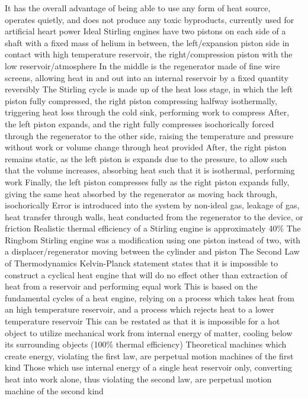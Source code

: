 \begin{outline*}
\2 It has the overall advantage of being able to use any form of heat source, operates quietly, and does not produce any toxic byproducts, currently used for artificial heart power
\2 Ideal Stirling engines have two pistons on each side of a shaft with a fixed mass of helium in between, the left/expansion piston side in contact with high temperature reservoir, the right/compression piston with the low reservoir/atmosphere
\3 In the middle is the regenerator made of fine wire screens, allowing heat in and out into an internal reservoir by a fixed quantity reversibly
\2 The Stirling cycle is made up of the heat loss stage, in which the left piston fully compressed, the right piston compressing halfway isothermally, triggering heat loss through the cold sink, performing work to compress
\3 After, the left piston expands, and the right fully compresses isochorically forced through the regenerator to the other side, raising the temperature and pressure without work or volume change through heat provided
\3 After, the right piston remains static, as the left piston is expands due to the pressure, to allow such that the volume increases, absorbing heat such that it is isothermal, performing work
\3 Finally, the left piston compresses fully as the right piston expands fully, giving the same heat absorbed by the regenerator as moving back through, isochorically
\2 Error is introduced into the system by non-ideal gas, leakage of gas, heat transfer through walls, heat conducted from the regenerator to the device, or friction
\3 Realistic thermal efficiency of a Stirling engine is approximately 40\%
\2 The Ringbom Stirling engine was a modification using one piston instead of two, with a displacer/regenerator moving between the cylinder and piston
\1 The Second Law of Thermodynamics Kelvin-Planck statement states that it is impossible to construct a cyclical heat engine that will do no effect other than extraction of heat from a reservoir and performing equal work
\2 This is based on the fundamental cycles of a heat engine, relying on a process which takes heat from an high temperature reservoir, and a process which rejects heat to a lower temperature reservoir
\3 This can be restated as that it is impossible for a hot object to utilize mechanical work from internal energy of matter, cooling below its surrounding objects (100\% thermal efficiency)
\2 Theoretical machines which create energy, violating the first law, are perpetual motion machines of the first kind
\2 Those which use internal energy of a single heat reservoir only, converting heat into work alone, thus violating the second law, are perpetual motion machine of the second kind

\end{outline*}
